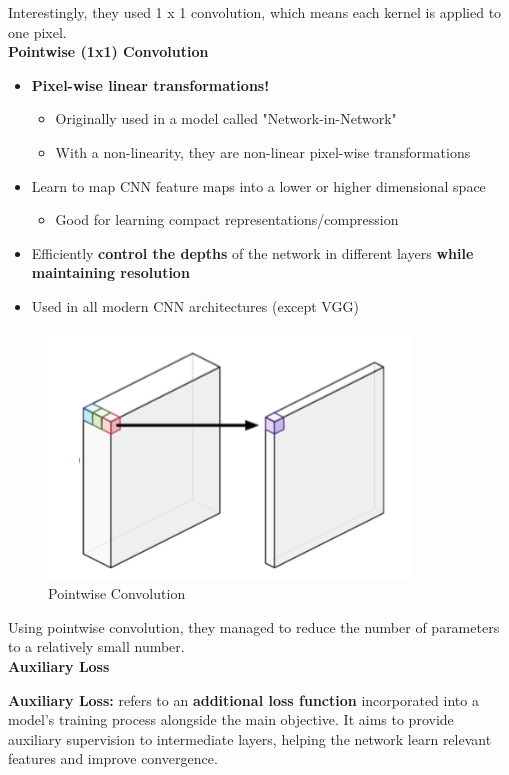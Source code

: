 Interestingly, they used 1 x 1 convolution, which means each kernel is applied to one pixel.\\

\textbf{Pointwise (1x1) Convolution}
\begin{itemize}
    \item \textbf{Pixel-wise linear transformations!}
    \begin{itemize}
        \item Originally used in a model called "Network-in-Network"
    \end{itemize}
    \begin{itemize}
        \item With a non-linearity, they are non-linear pixel-wise transformations
    \end{itemize}
    \item Learn to map CNN feature maps into a lower or higher dimensional space
    \begin{itemize}
        \item Good for learning compact representations/compression
    \end{itemize}
    \item Efficiently \textbf{control the depths} of the network in different layers \textbf{while maintaining resolution}
    \item Used in all modern CNN architectures (except VGG)

\end{itemize}

\begin{figure}[h!t]
    \centering
    \includegraphics[width=0.35\linewidth]{pointwiseconvolution.png}
    \caption{Pointwise Convolution}
    \label{fig:enter-label}
\end{figure}

Using pointwise convolution, they managed to reduce the number of parameters to a relatively small number.\\

\textbf{Auxiliary Loss}

\begin{definition}
    \textbf{Auxiliary Loss:} refers to an \textbf{additional loss function} incorporated into a model's training process alongside the main objective. It aims to provide auxiliary supervision to intermediate layers, helping the network learn relevant features and improve convergence.
\end{definition}

